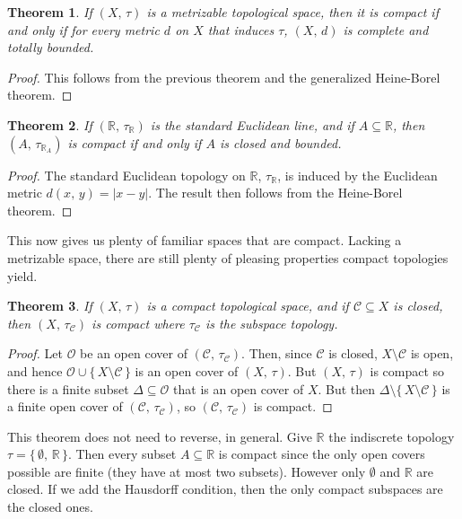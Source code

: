 \documentclass{article}
\theoremstyle{plain}
\newtheorem{theorem}{Theorem}[section]
\theoremstyle{normal}
\begin{document}
        \begin{theorem}
            If $(X,\,\tau)$ is a metrizable topological space, then it is
            compact if and only if for every metric $d$ on $X$ that induces
            $\tau$, $(X,\,d)$ is complete and totally bounded.
        \end{theorem}
        \begin{proof}
            This follows from the previous theorem and the generalized
            Heine-Borel theorem.
        \end{proof}
        \begin{theorem}
            If $(\mathbb{R},\,\tau_{\mathbb{R}})$ is the standard Euclidean
            line, and if $A\subseteq\mathbb{R}$, then
            $(A,\,\tau_{\mathbb{R}_{A}})$ is compact if and only if $A$ is
            closed and bounded.
        \end{theorem}
        \begin{proof}
            The standard Euclidean topology on $\mathbb{R}$,
            $\tau_{\mathbb{R}}$, is induced by the Euclidean metric
            $d(x,\,y)=|x-y|$. The result then follows from the Heine-Borel
            theorem.
        \end{proof}
        This now gives us plenty of familiar spaces that are compact.
        Lacking a metrizable space, there are still plenty of pleasing
        properties compact topologies yield.
        \begin{theorem}
            If $(X,\,\tau)$ is a compact topological space, and if
            $\mathcal{C}\subseteq{X}$ is closed, then
            $(X,\,\tau_{\mathcal{C}})$ is compact where $\tau_{\mathcal{C}}$ is
            the subspace topology.
        \end{theorem}
        \begin{proof}
            Let $\mathcal{O}$ be an open cover of
            $(\mathcal{C},\,\tau_{\mathcal{C}})$. Then, since
            $\mathcal{C}$ is closed, $X\setminus\mathcal{C}$ is open, and
            hence $\mathcal{O}\cup\{\,X\setminus\mathcal{C}\,\}$ is an open
            cover of $(X,\,\tau)$. But $(X,\,\tau)$ is compact so there is a
            finite subset $\Delta\subseteq\mathcal{O}$ that is an open cover
            of $X$. But then $\Delta\setminus\{\,X\setminus\mathcal{C}\,\}$ is
            a finite open cover of $(\mathcal{C},\,\tau_{\mathcal{C}})$, so
            $(\mathcal{C},\,\tau_{\mathcal{C}})$ is compact.
        \end{proof}
        This theorem does not need to reverse, in general. Give
        $\mathbb{R}$ the indiscrete topology
        $\tau=\{\,\emptyset,\,\mathbb{R}\,\}$. Then every subset
        $A\subseteq\mathbb{R}$ is compact since the only open covers possible
        are finite (they have at most two subsets). However only
        $\emptyset$ and $\mathbb{R}$ are closed. If we add the Hausdorff
        condition, then the only compact subspaces are the closed ones.
\end{document}
